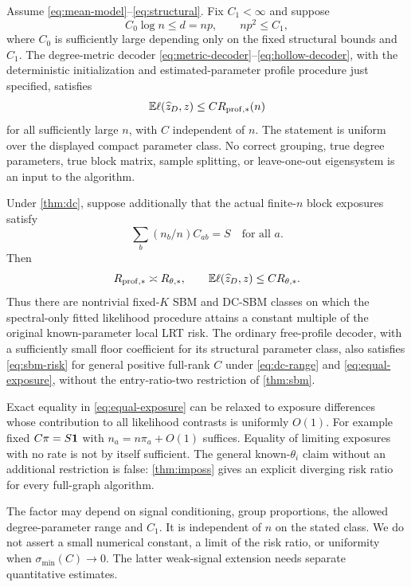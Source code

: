 \begin{theorem}
\label{thm:dc}
Assume \eqref{eq:mean-model}--\eqref{eq:structural}. Fix $C_1<\infty$ and
suppose
\begin{equation}\label{eq:dc-range}
 C_0\log n\le d=np,\qquad np^2\le C_1,
\end{equation}
where $C_0$ is sufficiently large depending only on the fixed structural
bounds and $C_1$. The degree-metric decoder
\eqref{eq:metric-decoder}--\eqref{eq:hollow-decoder}, with the deterministic
initialization and estimated-parameter profile procedure just specified,
satisfies
\begin{equation}\label{eq:dc-risk}
 \mathbb E\ell(\widehat z_D,z)\le C R_{\mathrm{prof},*}(n)
\end{equation}
for all sufficiently large $n$, with $C$ independent of $n$.
The statement is uniform over the displayed compact parameter class.
No correct grouping, true degree parameters, true block matrix, sample
splitting, or leave-one-out eigensystem is an input to the algorithm.
\end{theorem}

\begin{corollary}
\label{cor:known}
Under \cref{thm:dc}, suppose additionally that the actual finite-$n$ block
exposures satisfy
\begin{equation}\label{eq:equal-exposure}
 \sum_b(n_b/n)C_{ab}=S\quad\text{for all }a.
\end{equation}
Then
\[
 R_{\mathrm{prof},*}\asymp R_{\theta,*},\qquad
 \mathbb E\ell(\widehat z_D,z)\le C R_{\theta,*}.
\]
Thus there are nontrivial fixed-$K$ SBM and DC-SBM classes on which the
spectral-only fitted likelihood procedure attains a constant multiple of
the original known-parameter local LRT risk. The ordinary free-profile
decoder, with a sufficiently small floor coefficient for its structural
parameter class, also satisfies \eqref{eq:sbm-risk} for general positive
full-rank $C$ under \eqref{eq:dc-range} and \eqref{eq:equal-exposure},
without the entry-ratio-two restriction of \cref{thm:sbm}.
\end{corollary}

Exact equality in \eqref{eq:equal-exposure} can be relaxed to exposure
differences whose contribution to all likelihood contrasts is uniformly
$O(1)$. For example fixed $C\pi=S\mathbf 1$ with
$n_a=n\pi_a+O(1)$ suffices. Equality of limiting exposures with no rate
is not by itself sufficient. The general known-$\theta_i$ claim without
an additional restriction is false: \cref{thm:imposs} gives an explicit
diverging risk ratio for every full-graph algorithm.

\begin{remark}
The factor may depend on signal conditioning, group proportions, the
allowed degree-parameter range and $C_1$. It is independent of $n$ on
the stated class. We do not assert a small numerical constant, a limit of
the risk ratio, or uniformity when $\sigma_{\min}(C)\to0$. The latter
weak-signal extension needs separate quantitative estimates.
\end{remark}

